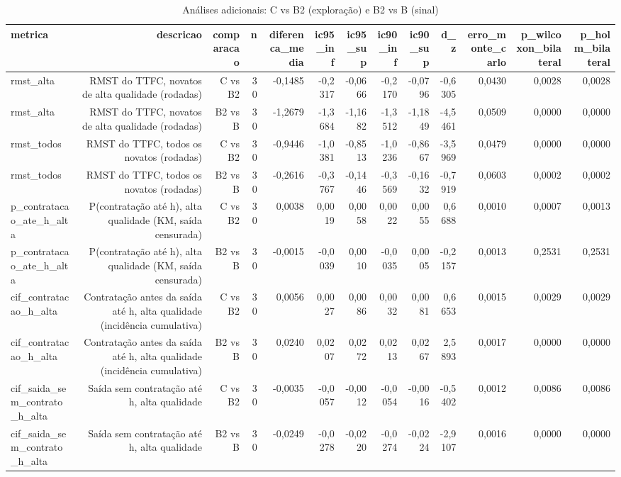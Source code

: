 \begin{table}[ht]
\centering
\caption{Análises adicionais: C vs B2 (exploração) e B2 vs B (sinal)}
\label{tab:comparacoes_adicionais}
\begin{tabular}{lrrrrrrrrrrrr}
\hline
\textbf{metrica} & \textbf{descricao} & \textbf{comparacao} & \textbf{n} & \textbf{diferenca\_media} & \textbf{ic95\_inf} & \textbf{ic95\_sup} & \textbf{ic90\_inf} & \textbf{ic90\_sup} & \textbf{d\_z} & \textbf{erro\_monte\_carlo} & \textbf{p\_wilcoxon\_bilateral} & \textbf{p\_holm\_bilateral} \\
\hline
rmst\_alta & RMST do TTFC, novatos de alta qualidade (rodadas) & C vs B2 & 30 & -0,1485 & -0,2317 & -0,0666 & -0,2170 & -0,0796 & -0,6305 & 0,0430 & 0,0028 & 0,0028 \\
rmst\_alta & RMST do TTFC, novatos de alta qualidade (rodadas) & B2 vs B & 30 & -1,2679 & -1,3684 & -1,1682 & -1,3512 & -1,1849 & -4,5461 & 0,0509 & 0,0000 & 0,0000 \\
rmst\_todos & RMST do TTFC, todos os novatos (rodadas) & C vs B2 & 30 & -0,9446 & -1,0381 & -0,8513 & -1,0236 & -0,8667 & -3,5969 & 0,0479 & 0,0000 & 0,0000 \\
rmst\_todos & RMST do TTFC, todos os novatos (rodadas) & B2 vs B & 30 & -0,2616 & -0,3767 & -0,1446 & -0,3569 & -0,1632 & -0,7919 & 0,0603 & 0,0002 & 0,0002 \\
p\_contratacao\_ate\_h\_alta & P(contratação até h), alta qualidade (KM, saída censurada) & C vs B2 & 30 & 0,0038 & 0,0019 & 0,0058 & 0,0022 & 0,0055 & 0,6688 & 0,0010 & 0,0007 & 0,0013 \\
p\_contratacao\_ate\_h\_alta & P(contratação até h), alta qualidade (KM, saída censurada) & B2 vs B & 30 & -0,0015 & -0,0039 & 0,0010 & -0,0035 & 0,0005 & -0,2157 & 0,0013 & 0,2531 & 0,2531 \\
cif\_contratacao\_h\_alta & Contratação antes da saída até h, alta qualidade (incidência cumulativa) & C vs B2 & 30 & 0,0056 & 0,0027 & 0,0086 & 0,0032 & 0,0081 & 0,6653 & 0,0015 & 0,0029 & 0,0029 \\
cif\_contratacao\_h\_alta & Contratação antes da saída até h, alta qualidade (incidência cumulativa) & B2 vs B & 30 & 0,0240 & 0,0207 & 0,0272 & 0,0213 & 0,0267 & 2,5893 & 0,0017 & 0,0000 & 0,0000 \\
cif\_saida\_sem\_contrato\_h\_alta & Saída sem contratação até h, alta qualidade & C vs B2 & 30 & -0,0035 & -0,0057 & -0,0012 & -0,0054 & -0,0016 & -0,5402 & 0,0012 & 0,0086 & 0,0086 \\
cif\_saida\_sem\_contrato\_h\_alta & Saída sem contratação até h, alta qualidade & B2 vs B & 30 & -0,0249 & -0,0278 & -0,0220 & -0,0274 & -0,0224 & -2,9107 & 0,0016 & 0,0000 & 0,0000 \\

\end{tabular}
\end{table}
